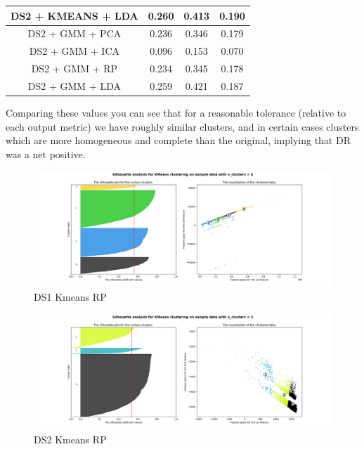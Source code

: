 \documentclass[11pt]{article}
\begin{document}
\begin{center}
\begin{tabular}{|c| c | c | c |}
            \hline
            DS2 + KMEANS + LDA & 0.260                         & 0.413             & 0.190              \\
            \hline
            DS2 + GMM + PCA    & 0.236                         & 0.346             & 0.179              \\
            \hline
            DS2 + GMM + ICA    & 0.096                         & 0.153             & 0.070              \\
            \hline
            DS2 + GMM + RP     & 0.234                         & 0.345             & 0.178              \\
            \hline
            DS2 + GMM + LDA    & 0.259                         & 0.421             & 0.187              \\
            \hline
        \end{tabular}
    \end{center}
    Comparing these values you can see that for a reasonable tolerance (relative to each output metric) we have roughly
    similar clusters, and in certain cases clusters which are more homogeneous and complete than the original, implying
    that DR was a net positive.
    \begin{figure}
        \centering
        \includegraphics[width=.9\linewidth]{ds1_kmeans_rp.png}
        \caption{DS1 Kmeans RP}\label{Fig:DS1 Kmeans RP}
    \end{figure}
    \begin{figure}
        \centering
        \includegraphics[width=.9\linewidth]{ds2_kmeans_rp.png}
        \caption{DS2 Kmeans RP}\label{Fig:DS2 Kmeans RP}
    \end{figure}
\end{document}
